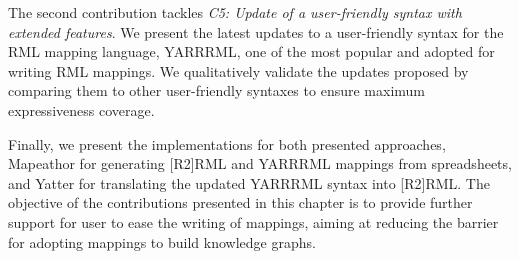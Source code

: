 The second contribution tackles \textit{C5: Update of a user-friendly syntax with extended features}. 
We present the latest updates to a user-friendly syntax for the RML mapping language, YARRRML, one of the most popular and adopted for writing RML mappings. 
We qualitatively validate the updates proposed by comparing them to other user-friendly syntaxes to ensure maximum expressiveness coverage. 

Finally, we present the implementations for both presented approaches, Mapeathor for generating [R2]RML and YARRRML mappings from spreadsheets, and Yatter for translating the updated YARRRML syntax into [R2]RML. The objective of the contributions presented in this chapter is to provide further support for user to ease the writing of mappings, aiming at reducing the barrier for adopting mappings to build knowledge graphs. 


